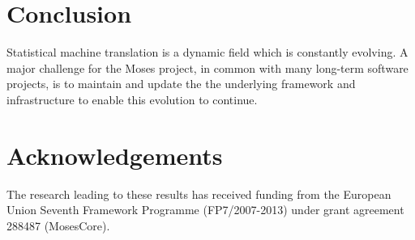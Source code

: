 \documentclass{pbml}
\begin{document}
\section{Conclusion}

Statistical machine translation is a dynamic field which is constantly evolving. A major challenge for the Moses project, in common with many long-term software projects, is to maintain and update the the underlying framework and infrastructure to enable this evolution to continue. 


\section*{Acknowledgements}

The research leading to these results has received funding from the European Union Seventh Framework Programme (FP7/2007-2013) under grant agreement 288487 (MosesCore).




\correspondingaddress
\end{document}
